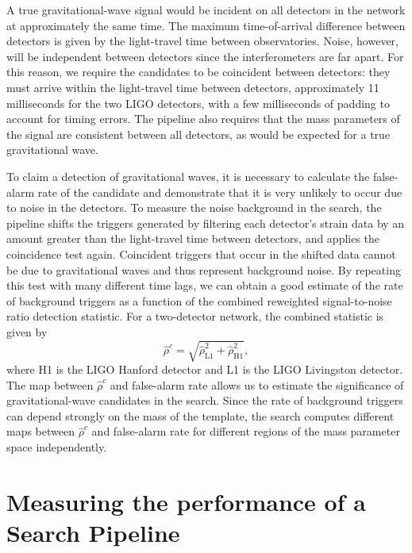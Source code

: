 A true gravitational-wave signal would be incident on all detectors in the network at
approximately the same time. The maximum time-of-arrival difference between
detectors is given by the light-travel time between observatories. Noise,
however, will be independent between detectors since the interferometers
are far apart. For this reason, we require the candidates to be coincident
between detectors: they must arrive within the light-travel time between detectors,
approximately 11 milliseconds for the two LIGO detectors, with
a few milliseconds of padding to account for timing errors. The pipeline also
requires that the mass parameters of the signal are consistent between all
detectors, as would be expected for a true gravitational wave. 

To claim a detection of gravitational waves, it is necessary to calculate the
false-alarm rate of the candidate and demonstrate that it is very unlikely to
occur due to noise in the detectors. To measure the noise background in the
search, the pipeline shifts the triggers generated by filtering each
detector's strain data by an amount greater than the light-travel time between
detectors, and applies the coincidence test again.  Coincident triggers that
occur in the shifted data cannot be due to gravitational waves and thus represent
background noise. By repeating this test with many different time lags, we can
obtain a good estimate of the rate of background triggers as a function of the
combined reweighted signal-to-noise ratio detection statistic. For a
two-detector network, the combined statistic is given by
%
\begin{equation}
\label{eq:cnewsnr}
\hat{\rho}^c = \sqrt{\hat{\rho}_\mathrm{L1}^2 + \hat{\rho}_\mathrm{H1}^2},
\end{equation}
%
where H1 is the LIGO Hanford detector and L1 is the LIGO Livingston detector. 
The map between $\hat{\rho}^c$ and false-alarm rate allows us to estimate the
significance of gravitational-wave candidates in the search. Since the rate of
background triggers can depend strongly on the mass of the template,
the search computes different maps between $\hat{\rho}^c$ and
false-alarm rate for different regions of the mass parameter space
independently. 

\section{Measuring the performance of a Search Pipeline}
\label{s:volume}

